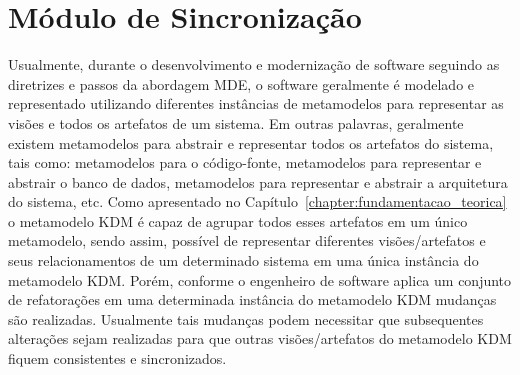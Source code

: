 \section{Módulo de Sincronização}\label{sec:modulo_de_sincronizacao_kdm_re}

Usualmente, durante o desenvolvimento e modernização de software seguindo as diretrizes e passos da abordagem MDE, o software geralmente é modelado e representado utilizando diferentes instâncias de metamodelos para representar as visões e todos os artefatos de um sistema. Em outras palavras, geralmente existem metamodelos para abstrair e representar todos os artefatos do sistema, tais como: metamodelos para o código-fonte, metamodelos para representar e abstrair o banco de dados, metamodelos para representar e abstrair a arquitetura do sistema, etc. Como apresentado no Capítulo~\ref{chapter:fundamentacao_teorica} o metamodelo KDM é capaz de agrupar todos esses artefatos em um único metamodelo, sendo assim, possível de representar diferentes visões/artefatos e seus relacionamentos de um determinado sistema em uma única instância do metamodelo KDM. Porém, conforme o engenheiro de software aplica um conjunto de refatorações em uma determinada instância do metamodelo KDM mudanças são realizadas. Usualmente tais mudanças podem necessitar que subsequentes alterações sejam realizadas para que outras visões/artefatos do metamodelo KDM fiquem consistentes e sincronizados.

